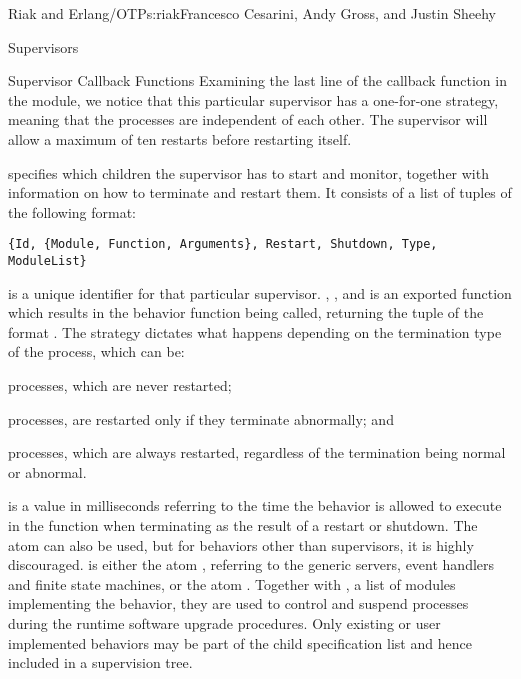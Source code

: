 \begin{aosachapter}{Riak and Erlang/OTP}{s:riak}{Francesco Cesarini, Andy Gross, and Justin Sheehy}
\begin{aosasect1}{Supervisors}
\begin{aosasect2}{Supervisor Callback Functions}
Examining the last line of the  callback function in the
 module, we notice that this particular
supervisor has a one-for-one strategy, meaning that the processes are
independent of each other. The supervisor will allow a maximum of ten
restarts before restarting itself.

 specifies which children the supervisor
has to start and monitor, together with information on how to
terminate and restart them. It consists of a list of tuples of the
following format:

\begin{verbatim}
{Id, {Module, Function, Arguments}, Restart, Shutdown, Type, ModuleList}
\end{verbatim}

 is a unique identifier for that particular
supervisor. , , and  is an
exported function which results in the behavior 
function being called, returning the tuple of the format . The  strategy dictates what happens
depending on the termination type of the process, which can be:

\begin{aosaitemize}

\item {} processes, which are never restarted;

  \item {} processes, are restarted only if they terminate
  abnormally; and

  \item {} processes, which are always restarted, regardless of
  the termination being normal or abnormal.

\end{aosaitemize}

 is a value in milliseconds referring to the time the
behavior is allowed to execute in the  function when
terminating as the result of a restart or shutdown. The atom
 can also be used, but for behaviors other than
supervisors, it is highly discouraged.  is either the atom
, referring to the generic servers, event handlers and
finite state machines, or the atom . Together with
, a list of modules implementing the behavior, they
are used to control and suspend processes during the runtime software
upgrade procedures. Only existing or user implemented behaviors may be
part of the child specification list and hence included in a
supervision tree.


\end{aosasect2}
\end{aosasect1}
\end{aosachapter}
